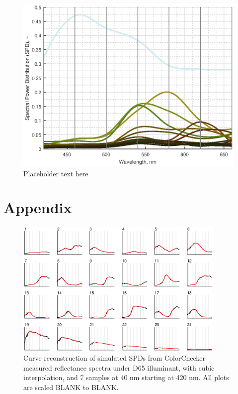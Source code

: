 \documentclass[twocolumn,10pt]{asme2ej}
\begin{document}
\begin{figure}[H]
\begin{centering}
  \includegraphics[height=0.6\linewidth]{vermont_path.eps}
  \caption{Placeholder text here}
  \label{tomato_SPDs}
  \end{centering}
\end{figure}

\clearpage

\section{Appendix}
\label{appendix}

\begin{figure}[H]
\begin{centering}
\includegraphics[width=0.90\textwidth]{colorchecker_reconstruction.eps}
\caption{Curve reconstruction of simulated SPDs from ColorChecker measured reflectance spectra under D65 illuminant, with cubic interpolation, and 7 samples at 40 nm starting at 420 nm. All plots are scaled BLANK to BLANK.}
\label{colorchecker_reconstruction}
\end{centering}
\end{figure}
\end{document}
